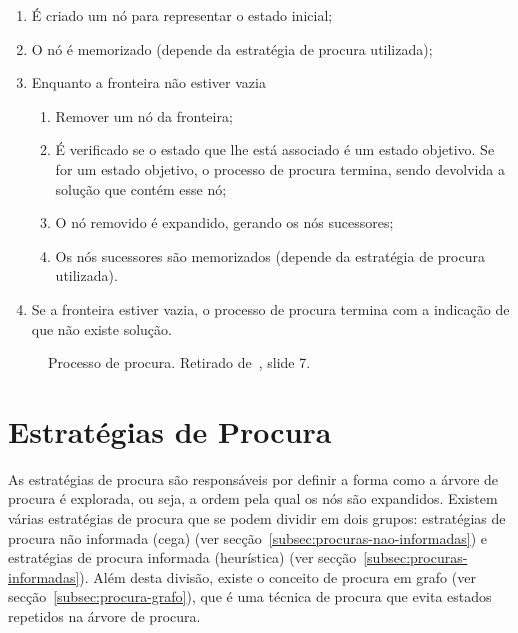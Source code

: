 \begin{enumerate}
    \item É criado um nó para representar o estado inicial;
    \item O nó é memorizado (depende da estratégia de procura utilizada);
    \item Enquanto a fronteira não estiver vazia
    \begin{enumerate}
        \item Remover um nó da fronteira;
        \item É verificado se o estado que lhe está associado é um estado objetivo.
        Se for um estado objetivo, o processo de procura termina, sendo devolvida a solução que contém esse nó;
        \item O nó removido é expandido, gerando os nós sucessores;
        \item Os nós sucessores são memorizados (depende da estratégia de procura utilizada).
    \end{enumerate}
    \item Se a fronteira estiver vazia, o processo de procura termina com a indicação de que não existe solução.
\end{enumerate}

\begin{figure}[H]
    \begin{center}
    \end{center}
    \caption{Processo de procura.
    Retirado de~\cite{isel:iasa:slides:proc-espaco-estados-parte-1}, slide 7.}
    \label{fig:processo-procura}
\end{figure}


\section{Estratégias de Procura}\label{sec:estrategias-procura}
As estratégias de procura são responsáveis por definir a forma como a árvore de procura é explorada, ou seja, a ordem pela qual os nós são expandidos.
Existem várias estratégias de procura que se podem dividir em dois grupos: estratégias de procura não informada (cega) (ver secção~\ref{subsec:procuras-nao-informadas}) e estratégias de procura informada (heurística) (ver secção~\ref{subsec:procuras-informadas}).
Além desta divisão, existe o conceito de procura em grafo (ver secção~\ref{subsec:procura-grafo}), que é uma técnica de procura que evita estados repetidos na árvore de procura.

